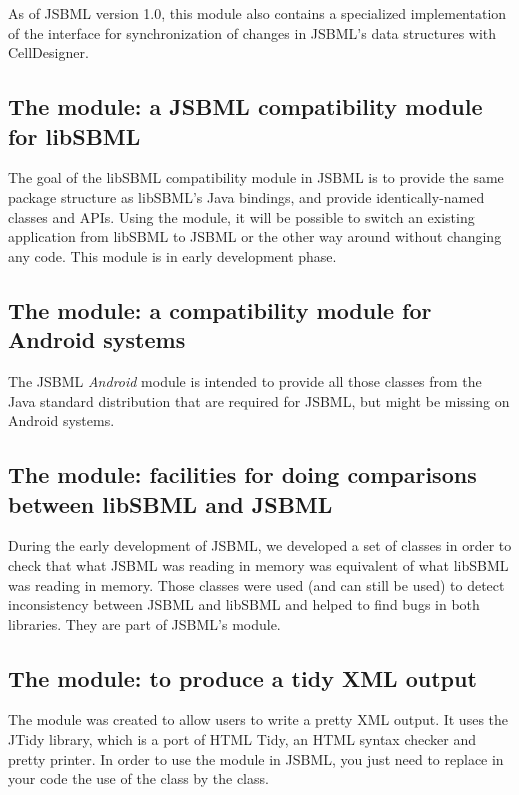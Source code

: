 As of JSBML version 1.0, this module also contains a specialized
implementation of the \TreeNodeChangeListener{} interface for
synchronization of changes in JSBML's data structures with CellDesigner.

\clearpage



\subsection{The  module: a JSBML compatibility
  module for libSBML}

The goal of the libSBML compatibility module in JSBML is to provide the
same package structure as libSBML's Java bindings, and provide
identically-named classes and APIs. Using the module, it will be possible
to switch an existing application from libSBML to JSBML or the other way
around without changing any code.  %
This module is in early development phase.


\subsection{The  module: a compatibility module for
  Android systems}

The JSBML \emph{Android} module is intended to provide all those classes
from the Java standard distribution that are required for JSBML, but might
be missing on Android systems.


\subsection{The  module: facilities for doing comparisons between libSBML and JSBML}

During the early development of JSBML, we developed a set of classes in
order to check that what JSBML was reading in memory was equivalent of what
libSBML was reading in memory. Those classes were used (and can still be
used) to detect inconsistency between JSBML and libSBML and helped to find
bugs in both libraries.  They are part of JSBML's  module.


\subsection{The  module: to produce a tidy XML output}

The  module was created to allow users to write a pretty XML
output.  It uses the JTidy library, which is a port of HTML Tidy, an HTML
syntax checker and pretty printer.  In order to use the  module in
JSBML, you just need to replace in your code the use of the \SBMLWriter{}
class by the \TidySBMLWriter{} class.
